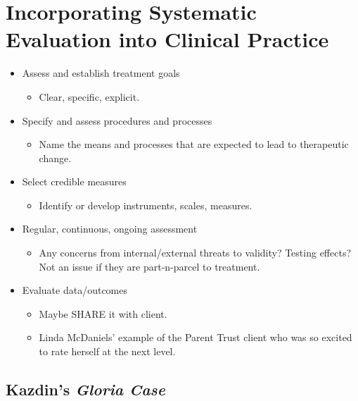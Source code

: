 \documentclass[
  english,
]{book}
\providecommand{\tightlist}{%
  \setlength{\itemsep}{0pt}\setlength{\parskip}{0pt}}
\begin{document}
\hypertarget{incorporating-systematic-evaluation-into-clinical-practice}{%
\section{Incorporating Systematic Evaluation into Clinical Practice}\label{incorporating-systematic-evaluation-into-clinical-practice}}

\begin{itemize}
\tightlist
\item
  Assess and establish treatment goals\citep{morgan_single-participant_2001}

  \begin{itemize}
  \tightlist
  \item
    Clear, specific, explicit.
  \end{itemize}
\item
  Specify and assess procedures and processes

  \begin{itemize}
  \tightlist
  \item
    Name the means and processes that are expected to lead to therapeutic change.
  \end{itemize}
\item
  Select credible measures

  \begin{itemize}
  \tightlist
  \item
    Identify or develop instruments, scales, measures.
  \end{itemize}
\item
  Regular, continuous, ongoing assessment

  \begin{itemize}
  \tightlist
  \item
    Any concerns from internal/external threats to validity? Testing effects? Not an issue if they are part-n-parcel to treatment.
  \end{itemize}
\item
  Evaluate data/outcomes

  \begin{itemize}
  \tightlist
  \item
    Maybe SHARE it with client.
  \item
    Linda McDaniels' example of the Parent Trust client who was so excited to rate herself at the next level.
  \end{itemize}
\end{itemize}

\hypertarget{kazdins--kazdin_research_2017-gloria-case}{%
\subsection{\texorpdfstring{Kazdin's \citeyearpar{kazdin_research_2017} \emph{Gloria Case}}{Kazdin's {[}-@kazdin\_research\_2017{]} Gloria Case}}\label{kazdins--kazdin_research_2017-gloria-case}}
\end{document}
